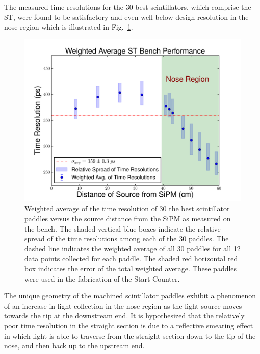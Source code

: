 The measured time resolutions for the 30 best scintillators, which comprise the ST, were found to be satisfactory and even well below design resolution in the nose region which is illustrated in Fig.~\ref{fig:time_res_comp_final_30}.
	\begin{figure}[!htb]
	\centering
	\includegraphics[width=1.0\columnwidth]{fabrication/figs/wtr_vs_dist}
	\caption{Weighted average of the time resolution of 30 the best scintillator paddles versus the source distance from the SiPM as measured on the bench.  The shaded vertical blue boxes indicate the relative spread of the time resolutions among each of the 30 paddles.  The dashed line indicates the weighted average of all 30 paddles for all 12 data points collected for each paddle.  The shaded red horizontal red box indicates the error of the total weighted average.  These paddles were used in the fabrication of the Start Counter.}
	\label{fig:time_res_comp_final_30}
	\end{figure}

The unique geometry of the machined scintillator paddles exhibit a phenomenon of an increase in light collection in the nose region as the light source moves towards the tip at the downstream end.  It is hypothesized that the relatively poor time resolution in the straight section is due to a reflective smearing effect in which light is able to traverse from the straight section down to the tip of the nose, and then back up to the upstream end.

